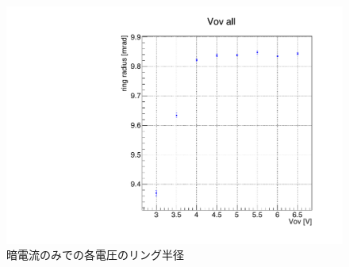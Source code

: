 \documentclass[uplatex, titlepage, dvipdfmx, 12pt, a4paper]{jsreport}
\begin{document}
      \begin{figure}[hbtp]
        \begin{center} 
          \includegraphics[scale=0.4, clip]{image/background_radius.pdf}
          \caption{暗電流のみでの各電圧のリング半径}
          \label{fig:darkcurrent_radius} 
        \end{center}
      \end{figure}
\end{document}
